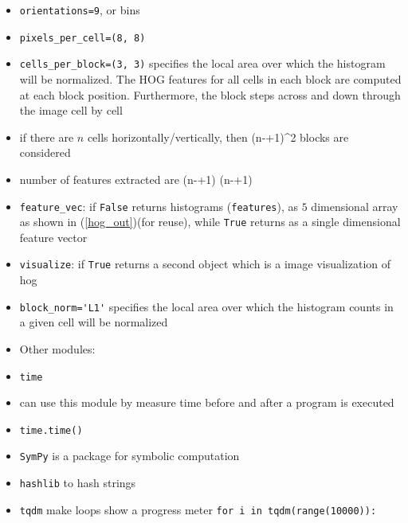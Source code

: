\documentclass[onecolumn]{IEEEtran} %
\begin{document}
\begin{itemize}
                \item \verb|orientations=9|, or bins
                \item \verb|pixels_per_cell=(8, 8)|
                \item \verb|cells_per_block=(3, 3)| specifies the local area over which the histogram will be normalized. The HOG features for all cells in each block are computed at each block position. Furthermore, the block steps across and down through the image cell by cell
                \item if there are $n$ cells horizontally/vertically, then
                \beq
                    (n-+1)^2
                \eeq
                blocks are considered
                \item number of features extracted are
                \beq\label{hog_out}
                     (n-+1) \times (n-+1) \times {} \times {} \times {}
                \eeq
                \item \verb|feature_vec|: if \verb|False| returns histograms (\verb|features|), as $5$ dimensional array as shown in (\ref{hog_out})(for reuse), while \verb|True| returns as a single dimensional feature vector
                \item \verb|visualize|: if \verb|True| returns a second object which is a image visualization of hog
                \item \verb|block_norm='L1'| specifies the local area over which the histogram counts in a given cell will be normalized
            \ei
        \ei
    \ei
    \item Other modules:
    \bi
        \item \verb|time|
        \bi
            \item can use this module by measure time before and after a program is executed
            \item \verb|time.time()|
        \ei
        \item \verb|SymPy| is a package for symbolic computation
        \item \verb|hashlib| to hash strings
        \item \verb|tqdm| make loops show a progress meter  \newline
        \verb|for i in tqdm(range(10000)):|
    \ei
\end{itemize}

\newpage
\end{document}
